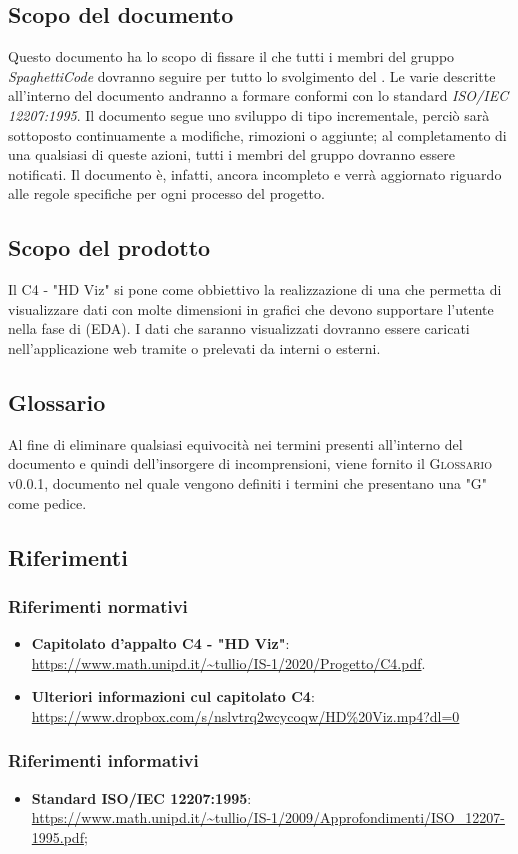 \documentclass[../norme_di_progetto.tex]{subfiles}
\begin{document}
\subsection{Scopo del documento}
Questo documento ha lo scopo di fissare il  che tutti i membri del gruppo \emph{SpaghettiCode} dovranno seguire per tutto lo svolgimento del .
Le varie  descritte all'interno del documento andranno a formare  conformi con lo standard \emph{ISO/IEC 12207:1995}.
Il documento segue uno sviluppo di tipo incrementale, perciò sarà sottoposto continuamente a modifiche, rimozioni o aggiunte; al completamento di una qualsiasi di queste azioni, tutti i membri del gruppo dovranno essere notificati. Il documento è, infatti, ancora incompleto e verrà aggiornato riguardo alle regole specifiche per ogni processo del progetto.

\subsection{Scopo del prodotto}
Il  C4 - "HD Viz" si pone come obbiettivo la realizzazione di una  che permetta di visualizzare dati con molte dimensioni in grafici che devono supportare l'utente nella fase di  (EDA).
I dati che saranno visualizzati dovranno essere caricati nell'applicazione web tramite  o prelevati da  interni o esterni.

\subsection{Glossario}
Al fine di eliminare qualsiasi equivocità nei termini presenti all'interno del documento e quindi dell'insorgere di incomprensioni, viene fornito il \textsc{Glossario v0.0.1}, documento nel quale vengono definiti i termini che presentano una "G" come pedice.

\subsection{Riferimenti}
\subsubsection{Riferimenti normativi}
\begin{itemize}
    \item \textbf{Capitolato d'appalto C4 - "HD Viz"}: \\ \url{https://www.math.unipd.it/~tullio/IS-1/2020/Progetto/C4.pdf}.
    
    \item \textbf{Ulteriori informazioni cul capitolato C4}: \\
    \url{https://www.dropbox.com/s/nslvtrq2wcycoqw/HD\%20Viz.mp4?dl=0}
\end{itemize}

\subsubsection{Riferimenti informativi}
\begin{itemize}
    \item \textbf{Standard ISO/IEC 12207:1995}: \\ \url{https://www.math.unipd.it/~tullio/IS-1/2009/Approfondimenti/ISO_12207-1995.pdf};
\end{itemize}
\end{document}
